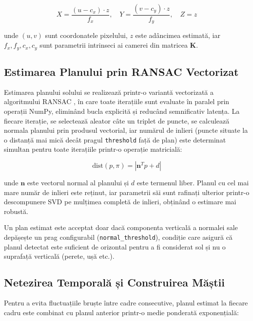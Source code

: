 \begin{equation}
    X = \frac{(u - c_x) \cdot z}{f_x}, \quad
    Y = \frac{(v - c_y) \cdot z}{f_y}, \quad
    Z = z
\end{equation}

\noindent unde $(u, v)$ sunt coordonatele pixelului, $z$ este adâncimea estimată, iar $f_x, f_y, c_x, c_y$ sunt parametrii intrinseci ai camerei din matricea $\mathbf{K}$.

\subsection{Estimarea Planului prin RANSAC Vectorizat}

\par Estimarea planului solului se realizează printr-o variantă vectorizată a algoritmului RANSAC \cite{10.1145/358669.358692}, în care toate iterațiile sunt evaluate în paralel prin operații NumPy, eliminând bucla explicită și reducând semnificativ latența. La fiecare iterație, se selectează aleator câte un triplet de puncte, se calculează normala planului prin produsul vectorial, iar numărul de inlieri (puncte situate la o distanță mai mică decât pragul \texttt{threshold} față de plan) este determinat simultan pentru toate iterațiile printr-o operație matricială:

\begin{equation}
    \text{dist}(p, \pi) = | \mathbf{n}^T p + d |
\end{equation}

\noindent unde $\mathbf{n}$ este vectorul normal al planului și $d$ este termenul liber. Planul cu cel mai mare număr de inlieri este reținut, iar parametrii săi sunt rafinați ulterior printr-o descompunere SVD pe mulțimea completă de inlieri, obținând o estimare mai robustă.

\par Un plan estimat este acceptat doar dacă componenta verticală a normalei sale depășește un prag configurabil (\texttt{normal\_threshold}), condiție care asigură că planul detectat este suficient de orizontal pentru a fi considerat sol și nu o suprafață verticală (perete, ușă etc.).

\subsection{Netezirea Temporală și Construirea Măștii}

\par Pentru a evita fluctuațiile bruște între cadre consecutive, planul estimat la fiecare cadru este combinat cu planul anterior printr-o medie ponderată exponențială:

